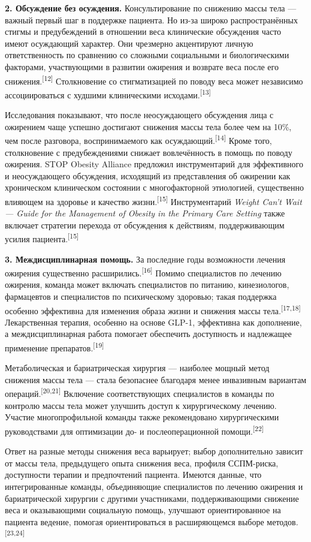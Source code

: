 \documentclass[11pt,a4paper]{article}
\newcommand{\src}[1]{\textsuperscript{[#1]}}
\begin{document}
\textbf{2. Обсуждение без осуждения.} Консультирование по снижению массы тела --- важный первый шаг в поддержке пациента. Но из-за широко распространённых стигмы и предубеждений в отношении веса клинические обсуждения часто имеют осуждающий характер. Они чрезмерно акцентируют личную ответственность по сравнению со сложными социальными и биологическими факторами, участвующими в развитии ожирения и возврате веса после его снижения.\src{12} Столкновение со стигматизацией по поводу веса может независимо ассоциироваться с худшими клиническими исходами.\src{13}

Исследования показывают, что после неосуждающего обсуждения лица с ожирением чаще успешно достигают снижения массы тела более чем на 10\%, чем после разговора, воспринимаемого как осуждающий.\src{14} Кроме того, столкновение с предубеждениями снижает вовлечённость в помощь по поводу ожирения. STOP Obesity Alliance предложил инструментарий для эффективного и неосуждающего обсуждения, исходящий из представления об ожирении как хроническом клиническом состоянии с многофакторной этиологией, существенно влияющем на здоровье и качество жизни.\src{15} Инструментарий \textit{Weight Can't Wait --- Guide for the Management of Obesity in the Primary Care Setting} также включает стратегии перехода от обсуждения к действиям, поддерживающим усилия пациента.\src{15}

\textbf{3. Междисциплинарная помощь.} За последние годы возможности лечения ожирения существенно расширились.\src{16} Помимо специалистов по лечению ожирения, команда может включать специалистов по питанию, кинезиологов, фармацевтов и специалистов по психическому здоровью; такая поддержка особенно эффективна для изменения образа жизни и снижения массы тела.\src{17,18} Лекарственная терапия, особенно на основе GLP-1, эффективна как дополнение, а междисциплинарная работа помогает обеспечить доступность и надлежащее применение препаратов.\src{19}

Метаболическая и бариатрическая хирургия --- наиболее мощный метод снижения массы тела --- стала безопаснее благодаря менее инвазивным вариантам операций.\src{20,21} Включение соответствующих специалистов в команды по контролю массы тела может улучшить доступ к хирургическому лечению. Участие многопрофильной команды также рекомендовано хирургическими руководствами для оптимизации до- и послеоперационной помощи.\src{22}

Ответ на разные методы снижения веса варьирует; выбор дополнительно зависит от массы тела, предыдущего опыта снижения веса, профиля ССПМ-риска, доступности терапии и предпочтений пациента. Имеются данные, что интегрированные команды, объединяющие специалистов по лечению ожирения и бариатрической хирургии с другими участниками, поддерживающими снижение веса и оказывающими социальную помощь, улучшают ориентированное на пациента ведение, помогая ориентироваться в расширяющемся выборе методов.\src{23,24}
\end{document}
